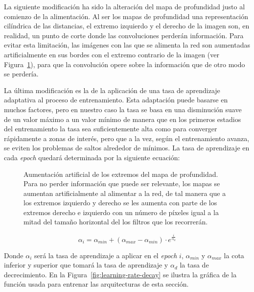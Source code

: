 La siguiente modificación ha sido la alteración del mapa de profundidad justo al comienzo de la alimentación. Al ser los mapas de profundidad una representación cilíndrica de las distancias, el extremo izquierdo y el derecho de la imagen son, en realidad, un punto de corte donde las convoluciones perderán información. Para evitar esta limitación, las imágenes con las que se alimenta la red son aumentadas artificialmente en sus bordes con el extremo contrario de la imagen (ver Figura~\ref{fig:deepmap-augmentation-in-cnn}), para que la convolución opere sobre la información que de otro modo se perdería.

La última modificación es la de la aplicación de una tasa de aprendizaje adaptativa al proceso de entrenamiento. Esta adaptación puede basarse en muchos factores, pero en nuestro caso la tasa se basa en una disminución suave de un valor máximo a un valor mínimo de manera que en los primeros estadios del entrenamiento la tasa sea suficientemente alta como para converger rápidamente a zonas de interés, pero que a la vez, según el entrenamiento avanza, se eviten los problemas de saltos alrededor de mínimos. La tasa de aprendizaje en cada \textit{epoch} quedará determinada por la siguiente ecuación:

\begin{figure}[t]
	\centering
	\caption[Aumentación artificial de los extremos del mapa de profundidad]{Aumentación artificial de los extremos del mapa de profundidad. Para no perder información que puede ser relevante, los mapas se aumentan artificialmente al alimentar a la red, de tal manera que a los extremos izquierdo y derecho se les aumenta con parte de los extremos derecho e izquierdo con un número de píxeles igual a la mitad del tamaño horizontal del los filtros que los recorrerán.}
	\label{fig:deepmap-augmentation-in-cnn}
\end{figure}

\begin{equation}
    \alpha_i = \alpha_{min} + (\alpha_{max} - \alpha_{min}) \cdot e^\frac{i}{\alpha_d}
	\label{eq:learning-rate-decay}
\end{equation}

Donde $\alpha_i$ será la tasa de aprendizaje a aplicar en el \textit{epoch} $i$, $\alpha_{min}$ y $\alpha_{max}$ la cota inferior y superior que tomará la tasa de aprendizaje y $\alpha_d$ la tasa de decrecimiento. En la Figura~\ref{fig:learning-rate-decay} se ilustra la gráfica de la función usada para entrenar las arquitecturas de esta sección.

